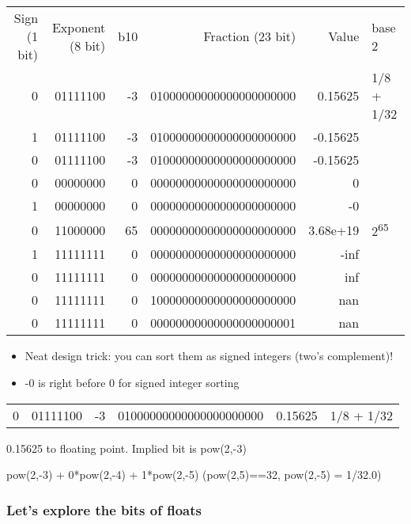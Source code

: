 \documentclass[11pt]{article}
\begin{document}
\begin{center}
\begin{tabular}{rrrrrl}
Sign (1 bit) & Exponent (8 bit) & b10 & Fraction (23 bit) & Value & base 2\\
0 & 01111100 & -3 & 01000000000000000000000 & 0.15625 & 1/8 + 1/32\\
1 & 01111100 & -3 & 01000000000000000000000 & -0.15625 & \\
0 & 01111100 & -3 & 01000000000000000000000 & -0.15625 & \\
0 & 00000000 & 0 & 00000000000000000000000 & 0 & \\
1 & 00000000 & 0 & 00000000000000000000000 & -0 & \\
0 & 11000000 & 65 & 00000000000000000000000 & 3.68e+19 & 2\textsuperscript{65}\\
1 & 11111111 & 0 & 00000000000000000000000 & -inf & \\
0 & 11111111 & 0 & 00000000000000000000000 & inf & \\
0 & 11111111 & 0 & 10000000000000000000000 & nan & \\
0 & 11111111 & 0 & 00000000000000000000001 & nan & \\
\end{tabular}
\end{center}

\begin{itemize}
\item Neat design trick: you can sort them as signed integers (two's complement)!
\item -0 is right before 0 for signed integer sorting
\end{itemize}

\begin{center}
\begin{tabular}{rrrrrl}
0 & 01111100 & -3 & 01000000000000000000000 & 0.15625 & 1/8 + 1/32\\
\end{tabular}
\end{center}

0.15625 to floating point. Implied bit is pow(2,-3)

pow(2,-3) + 0*pow(2,-4) + 1*pow(2,-5) (pow(2,5)==32, pow(2,-5) = 1/32.0)

\subsubsection{Let's explore the bits of floats}
\label{sec:org3d1fbce}
\end{document}
